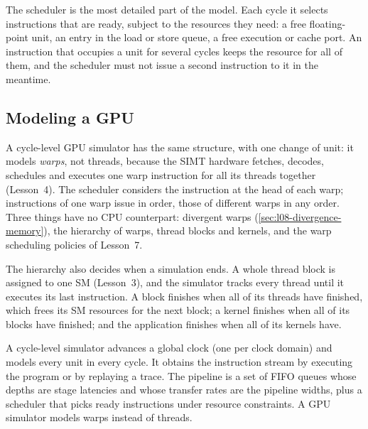 \documentclass[../main.tex]{subfiles}
\begin{document}
The scheduler is the most detailed part of the model.  Each cycle it
selects instructions that are ready, subject to the resources they
need: a free floating-point unit, an entry in the load or store queue,
a free execution or cache port.  An instruction that occupies a unit for
several cycles keeps the resource for all of them, and the scheduler
must not issue a second instruction to it in the meantime.

\subsection{Modeling a GPU}

A cycle-level GPU simulator has the same structure, with one change
of unit: it models \emph{warps}, not threads, because the SIMT hardware
fetches, decodes, schedules and executes one warp instruction for all
its threads together (Lesson~4).  The scheduler considers the
instruction at the head of each warp; instructions of one warp issue in
order, those of different warps in any order.  Three things have no CPU
counterpart: divergent warps (\cref{sec:l08-divergence-memory}), the
hierarchy of warps, thread blocks and kernels, and the warp scheduling
policies of Lesson~7.

The hierarchy also decides when a simulation ends.  A whole thread
block is assigned to one SM (Lesson~3), and the simulator tracks every
thread until it executes its last instruction.  A block finishes when
all of its threads have finished, which frees its SM resources for the
next block; a kernel finishes when all of its blocks have finished; and
the application finishes when all of its kernels have.

\begin{keypoint}
  A cycle-level simulator advances a global clock (one per clock
  domain) and models every unit in every cycle.  It obtains the
  instruction stream by executing the program or by replaying a trace.
  The pipeline is a set of FIFO queues whose depths are stage
  latencies and whose transfer rates are the pipeline widths, plus a
  scheduler that picks ready instructions under resource constraints.
  A GPU simulator models warps instead of threads.
\end{keypoint}
\end{document}
